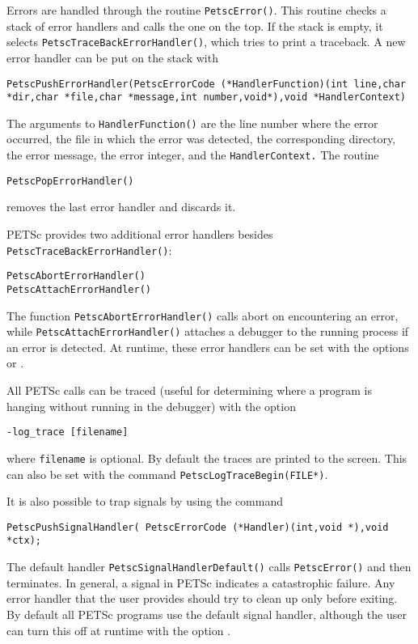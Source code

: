 {{Errors are handled through the routine \lstinline{PetscError()}.
This routine
checks a stack of error handlers and calls the one on the top.
If the stack is empty, it selects \lstinline{PetscTraceBackErrorHandler()},
which tries to print a traceback.
A new error handler can be put on the stack with
\begin{lstlisting}
PetscPushErrorHandler(PetscErrorCode (*HandlerFunction)(int line,char *dir,char *file,char *message,int number,void*),void *HandlerContext)
\end{lstlisting}
The arguments to \lstinline{HandlerFunction()} are the line number where
the error occurred, the file in which the error was detected, the corresponding
directory, the error message, the error integer, and the \lstinline{HandlerContext.}
The routine
\begin{lstlisting}
PetscPopErrorHandler()
\end{lstlisting}
removes the last error handler and discards it.

PETSc provides two additional error handlers besides
\lstinline{PetscTraceBackErrorHandler()}:
\begin{lstlisting}
PetscAbortErrorHandler()
PetscAttachErrorHandler()
\end{lstlisting}
The function \lstinline{PetscAbortErrorHandler()} calls abort on encountering an error, while
\break\lstinline{PetscAttachErrorHandler()} attaches a debugger to the running process
if an error is detected. At runtime, these error handlers can be set
with the options  or   .

All PETSc calls can be traced (useful for determining where a program is
hanging without running in the debugger) with the option
\begin{lstlisting}
-log_trace [filename]
\end{lstlisting}
where \lstinline{filename} is optional. By default the traces are printed to the
screen.  This can also be set with the
command \lstinline{PetscLogTraceBegin(FILE*)}. 

It is also possible to trap signals by using the 
command
\begin{lstlisting}
PetscPushSignalHandler( PetscErrorCode (*Handler)(int,void *),void *ctx);
\end{lstlisting}
The default handler \lstinline{PetscSignalHandlerDefault()}
calls
\lstinline{PetscError()} and then terminates. In general, a signal in PETSc
indicates a catastrophic failure.  Any error handler that the user provides
should try to clean up only before exiting.  By default all PETSc programs
use the default signal handler, although the user can turn this off
at runtime with the
option  .

}}
